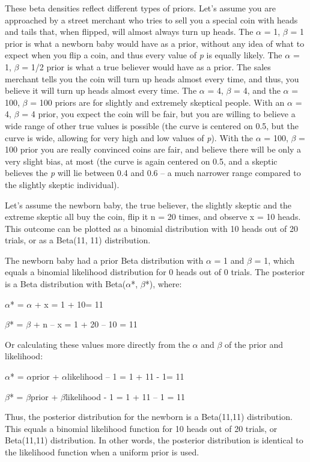 \documentclass[
  oneside]{book}
\begin{document}
These beta densities reflect different types of priors. Let's assume you are approached by a street merchant who tries to sell you a special coin with heads and tails that, when flipped, will almost always turn up heads. The \(\alpha\) = 1, \(\beta\) = 1 prior is what a newborn baby would have as a prior, without any idea of what to expect when you flip a coin, and thus every value of \emph{p} is equally likely. The \(\alpha\) = 1, \(\beta\) = 1/2 prior is what a true believer would have as a prior. The sales merchant tells you the coin will turn up heads almost every time, and thus, you believe it will turn up heads almost every time. The \(\alpha\) = 4, \(\beta\) = 4, and the \(\alpha\) = 100, \(\beta\) = 100 priors are for slightly and extremely skeptical people. With an \(\alpha\) = 4, \(\beta\) = 4 prior, you expect the coin will be fair, but you are willing to believe a wide range of other true values is possible (the curve is centered on 0.5, but the curve is wide, allowing for very high and low values of \emph{p}). With the \(\alpha\) = 100, \(\beta\) = 100 prior you are really convinced coins are fair, and believe there will be only a very slight bias, at most (the curve is again centered on 0.5, and a skeptic believes the \emph{p} will lie between 0.4 and 0.6 -- a much narrower range compared to the slightly skeptic individual).

Let's assume the newborn baby, the true believer, the slightly skeptic and the extreme skeptic all buy the coin, flip it n = 20 times, and observe x = 10 heads. This outcome can be plotted as a binomial distribution with 10 heads out of 20 trials, or as a Beta(11, 11) distribution.

The newborn baby had a prior Beta distribution with \(\alpha\) = 1 and \(\beta\) = 1, which equals a binomial likelihood distribution for 0 heads out of 0 trials. The posterior is a Beta distribution with Beta(\(\alpha\)*, \(\beta\)*), where:

\(\alpha\)* = \(\alpha\) + x = 1 + 10= 11

\(\beta\)* = \(\beta\) + n -- x = 1 + 20 -- 10 = 11

Or calculating these values more directly from the \(\alpha\) and \(\beta\) of the prior and
likelihood:

\(\alpha\)* = \(\alpha\)prior + \(\alpha\)likelihood -- 1 = 1 + 11 - 1= 11

\(\beta\)* = \(\beta\)prior + \(\beta\)likelihood - 1 = 1 + 11 -- 1 = 11

Thus, the posterior distribution for the newborn is a Beta(11,11) distribution. This equals a binomial likelihood function for 10 heads out of 20 trials, or Beta(11,11) distribution. In other words, the posterior distribution is identical to the likelihood function when a uniform prior is used.
\end{document}
